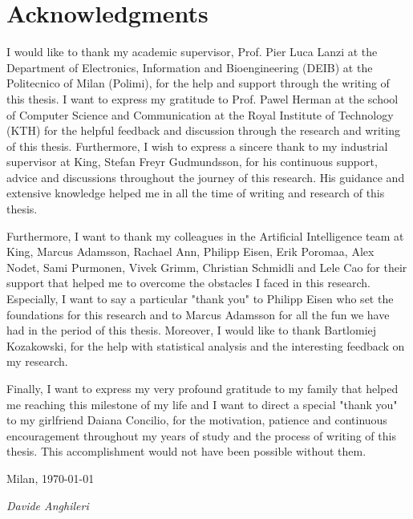\chapter*{Acknowledgments}


I would like to thank my academic supervisor, Prof. Pier Luca Lanzi at the Department of Electronics, Information and Bioengineering (DEIB) at the Politecnico of Milan (Polimi), for the help and support through the writing of this thesis. I want to express my gratitude to Prof. Pawel Herman at the school of Computer Science and Communication at the Royal Institute of Technology (KTH) for the helpful feedback and discussion through the research and writing of this thesis.
Furthermore, I wish to express a sincere thank to my industrial supervisor at King, Stefan Freyr Gudmundsson, for his continuous support, advice and discussions throughout the journey of this research. His guidance and extensive knowledge helped me in all the time of writing and research of this thesis.

Furthermore, I want to thank my colleagues in the Artificial Intelligence team at King, Marcus Adamsson, Rachael Ann, Philipp Eisen, Erik Poromaa, Alex Nodet, Sami Purmonen, Vivek Grimm, Christian Schmidli and Lele Cao for their support that helped me to overcome the obstacles I faced in this research. Especially, I want to say a particular "thank you" to Philipp Eisen who set the foundations for this research and to Marcus Adamsson for all the fun we have had in the period of this thesis.
Moreover, I would like to thank Bartlomiej Kozakowski, for the help with statistical analysis and the interesting feedback on my research.

Finally, I want to express my very profound gratitude to my family that helped me reaching this milestone of my life and I want to direct a special "thank you" to my girlfriend Daiana Concilio, for the motivation, patience and continuous encouragement throughout my years of study and the process of writing of this thesis. This accomplishment would not have been possible without them.


\vspace{1.0cm}

\noindent
Milan, \today

\noindent
\textit{Davide Anghileri}
